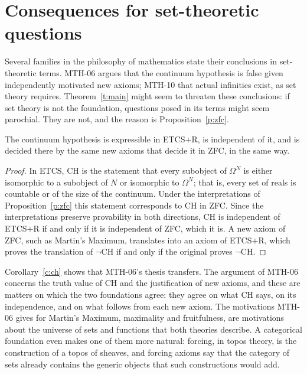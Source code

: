 \documentclass{situationist-preprint}
\begin{document}
\section{Consequences for set-theoretic questions}\label{s:consequences}

Several families in the philosophy of mathematics state their conclusions in set-theoretic terms. MTH-06 argues that the continuum hypothesis is false given independently motivated new axioms; MTH-10 that actual infinities exist, as set theory requires. Theorem~\ref{t:main} might seem to threaten these conclusions: if set theory is not the foundation, questions posed in its terms might seem parochial. They are not, and the reason is Proposition~\ref{p:zfc}.

\begin{corollary}\label{c:ch}
The continuum hypothesis is expressible in ETCS$+$R, is independent of it, and is decided there by the same new axioms that decide it in ZFC, in the same way.
\end{corollary}

\begin{proof}
In ETCS, CH is the statement that every subobject of $\Omega^N$ is either isomorphic to a subobject of $N$ or isomorphic to $\Omega^N$; that is, every set of reals is countable or of the size of the continuum. Under the interpretations of Proposition~\ref{p:zfc} this statement corresponds to CH in ZFC. Since the interpretations preserve provability in both directions, CH is independent of ETCS$+$R if and only if it is independent of ZFC, which it is. A new axiom of ZFC, such as Martin's Maximum, translates into an axiom of ETCS$+$R, which proves the translation of $\neg$CH if and only if the original proves $\neg$CH.
\end{proof}

Corollary~\ref{c:ch} shows that MTH-06's thesis transfers. The argument of MTH-06 concerns the truth value of CH and the justification of new axioms, and these are matters on which the two foundations agree: they agree on what CH says, on its independence, and on what follows from each new axiom. The motivations MTH-06 gives for Martin's Maximum, maximality and fruitfulness, are motivations about the universe of sets and functions that both theories describe. A categorical foundation even makes one of them more natural: forcing, in topos theory, is the construction of a topos of sheaves, and forcing axioms say that the category of sets already contains the generic objects that such constructions would add.
\end{document}
